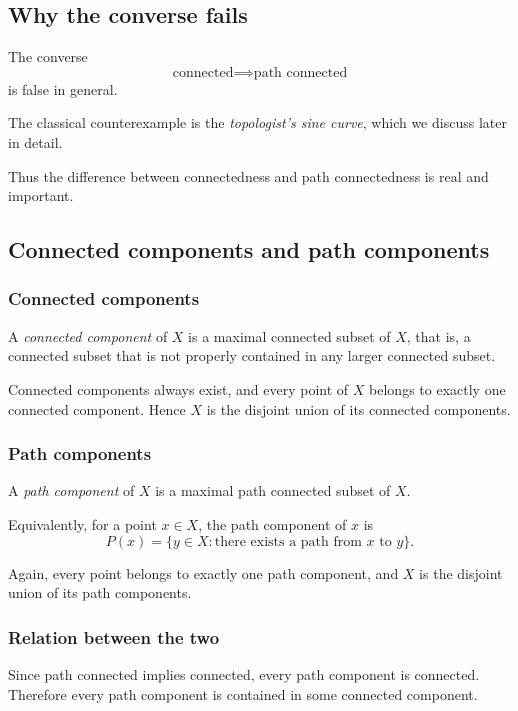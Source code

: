 \documentclass[12pt,a4paper]{article}
\theoremstyle{notespace}
\begin{document}
\subsection{Why the converse fails}

The converse
\[
\text{connected} \implies \text{path connected}
\]
is false in general.

The classical counterexample is the \emph{topologist's sine curve}, which we discuss later in detail.

Thus the difference between connectedness and path connectedness is real and important.

\subsection{Connected components and path components}

\subsubsection{Connected components}

A \emph{connected component} of \(X\) is a maximal connected subset of \(X\), that is, a connected subset that is not properly contained in any larger connected subset.

Connected components always exist, and every point of \(X\) belongs to exactly one connected component. Hence \(X\) is the disjoint union of its connected components.

\subsubsection{Path components}

A \emph{path component} of \(X\) is a maximal path connected subset of \(X\).

Equivalently, for a point \(x\in X\), the path component of \(x\) is
\[
P(x)=\{y\in X : \text{there exists a path from } x \text{ to } y\}.
\]

Again, every point belongs to exactly one path component, and \(X\) is the disjoint union of its path components.

\subsubsection{Relation between the two}

Since path connected implies connected, every path component is connected. Therefore every path component is contained in some connected component.
\end{document}
